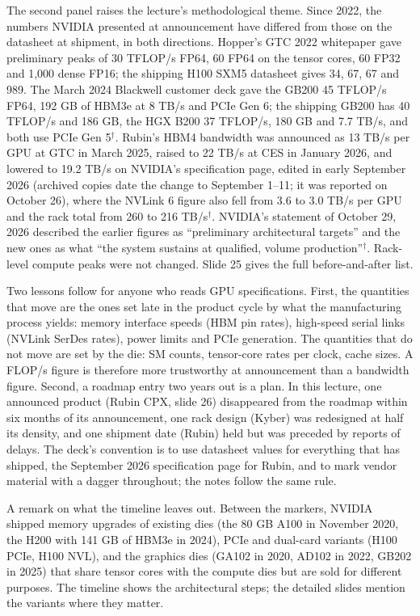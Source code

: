 \documentclass[11pt,letterpaper]{article}
\begin{document}
The second panel raises the lecture's methodological theme. Since 2022, the numbers NVIDIA presented at announcement have differed from those on the datasheet at shipment, in both directions. Hopper's GTC 2022 whitepaper gave preliminary peaks of 30 TFLOP/s FP64, 60 FP64 on the tensor cores, 60 FP32 and 1,000 dense FP16; the shipping H100 SXM5 datasheet gives 34, 67, 67 and 989. The March 2024 Blackwell customer deck gave the GB200 45 TFLOP/s FP64, 192 GB of HBM3e at 8 TB/s and PCIe Gen 6; the shipping GB200 has 40 TFLOP/s and 186 GB, the HGX B200 37 TFLOP/s, 180 GB and 7.7 TB/s, and both use PCIe Gen 5$^\dagger$. Rubin's HBM4 bandwidth was announced as 13 TB/s per GPU at GTC in March 2025, raised to 22 TB/s at CES in January 2026, and lowered to 19.2 TB/s on NVIDIA's specification page, edited in early September 2026 (archived copies date the change to September 1--11; it was reported on October 26), where the NVLink 6 figure also fell from 3.6 to 3.0 TB/s per GPU and the rack total from 260 to 216 TB/s$^\dagger$. NVIDIA's statement of October 29, 2026 described the earlier figures as ``preliminary architectural targets'' and the new ones as what ``the system sustains at qualified, volume production''$^\dagger$. Rack-level compute peaks were not changed. Slide 25 gives the full before-and-after list.

Two lessons follow for anyone who reads GPU specifications. First, the quantities that move are the ones set late in the product cycle by what the manufacturing process yields: memory interface speeds (HBM pin rates), high-speed serial links (NVLink SerDes rates), power limits and PCIe generation. The quantities that do not move are set by the die: SM counts, tensor-core rates per clock, cache sizes. A FLOP/s figure is therefore more trustworthy at announcement than a bandwidth figure. Second, a roadmap entry two years out is a plan. In this lecture, one announced product (Rubin CPX, slide 26) disappeared from the roadmap within six months of its announcement, one rack design (Kyber) was redesigned at half its density, and one shipment date (Rubin) held but was preceded by reports of delays. The deck's convention is to use datasheet values for everything that has shipped, the September 2026 specification page for Rubin, and to mark vendor material with a dagger throughout; the notes follow the same rule.

A remark on what the timeline leaves out. Between the markers, NVIDIA shipped memory upgrades of existing dies (the 80 GB A100 in November 2020, the H200 with 141 GB of HBM3e in 2024), PCIe and dual-card variants (H100 PCIe, H100 NVL), and the graphics dies (GA102 in 2020, AD102 in 2022, GB202 in 2025) that share tensor cores with the compute dies but are sold for different purposes. The timeline shows the architectural steps; the detailed slides mention the variants where they matter.
\end{document}
